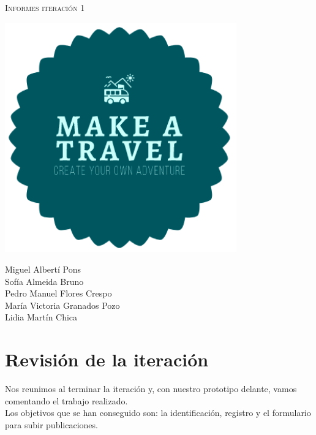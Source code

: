 \documentclass[11pt]{article}
\begin{document}
\begin{titlepage}
\centering
\vspace{4.5cm}
{\scshape\LARGE Informes iteración 1\par}
\vspace{1.5cm}

\includegraphics[width=10cm] {Logo}

\vspace{3cm}
{\scshape\large \par}
\vspace{1cm}

{Miguel Albertí Pons\\
Sofía Almeida Bruno\\
Pedro Manuel Flores Crespo\\
María Victoria Granados Pozo\\
Lidia Martín Chica
\par}

\end{titlepage}

\newpage

\section*{Revisión de la iteración}
Nos reunimos al terminar la iteración y, con nuestro prototipo delante, vamos comentando el trabajo realizado.\\

Los objetivos que se han conseguido son: la identificación, registro y el formulario para subir publicaciones.\\
\end{document}
